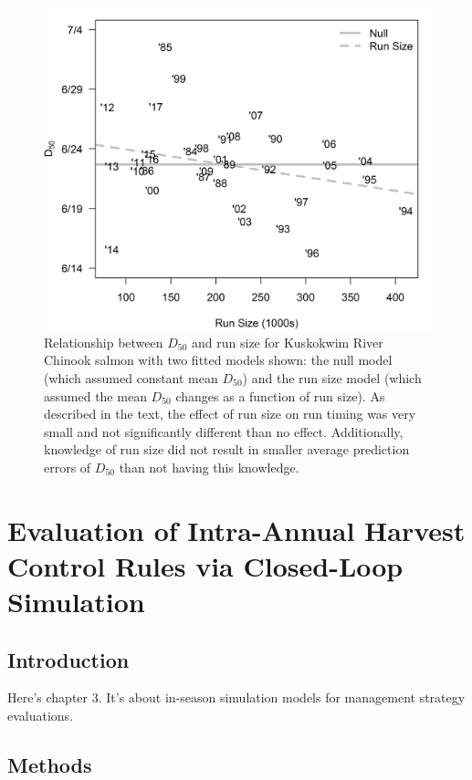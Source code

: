 \documentclass[12pt,]{book}
\theoremstyle{definition}
\theoremstyle{definition}
\theoremstyle{definition}
\theoremstyle{remark}
\begin{document}
\begin{figure}
  \centering
  \includegraphics{img/Ch2/rt-n.png}
  \caption{Relationship between $D_{50}$ and run size for Kuskokwim River Chinook salmon with two fitted models shown: the null model (which assumed constant mean $D_{50}$) and the run size model (which assumed the mean $D_{50}$ changes as a function of run size). As described in the text, the effect of run size on run timing was very small and not significantly different than no effect. Additionally, knowledge of run size did not result in smaller average prediction errors of $D_{50}$ than not having this knowledge.}
  \label{fig:rt-n}
\end{figure}

\chapter{Evaluation of Intra-Annual Harvest Control Rules via
Closed-Loop Simulation}\label{ch3}

\section{Introduction}\label{introduction-1}

Here's chapter 3. It's about in-season simulation models for management
strategy evaluations.

\section{Methods}\label{methods-1}
\end{document}
